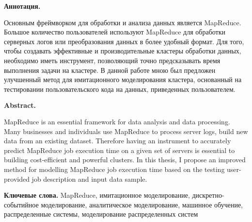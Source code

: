 \documentclass[../diploma.tex]{subfile}
\begin{document}
    {\small\bf
        Аннотация. 

        Основным фреймворком для обработки и анализа данных является MapReduce.
        Большое количество пользователей используют MapReduce для обработки
        серверных логов или преобразования данных в более удобный формат. Для
        того, чтобы создавать эффективные и производительные кластеры обработки
        данных, необходимо иметь инструмент, позволяющий точно предсказывать
        время выполнения задачи на кластере. В данной работе мною был предложен
        улучшенный метод для имитационного моделирования кластера, основанный на
        тестировании пользовательского кода на данных, приведенных
        пользователем.
    }

    
    {\small\bf
        Abstract.
            
        MapReduce is an essential framework for data analysis and data
        processing. Many businesses and individuals use MapReduce to process
        server logs, build new data from an existing dataset. Therefore having
        an instrument to accurately predict MapReduce job execution time on a
        given set of servers is essential to building cost-efficient and
        powerful clusters. In this thesis, I propose an improved method for
        modelling MapReduce job execution time based on the testing
        user-provided job description and input data sample.
    }

    {\small{\bf Ключевые слова.} MapReduce, имитационное моделирование,
    дискретно-событийное моделирование, аналитическое моделирование, машинное
    обучение, распределенные системы, моделирование распределенных систем}
\end{document}
